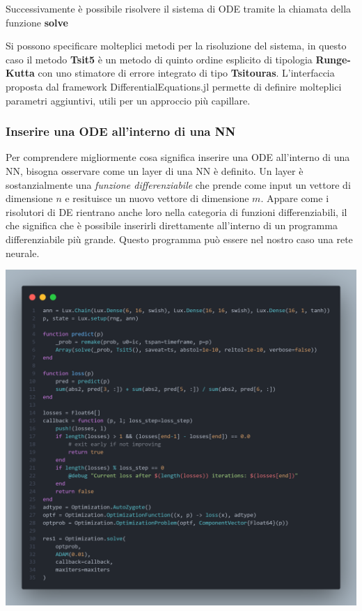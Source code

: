 Successivamente è possibile risolvere il sistema di ODE tramite la chiamata
della funzione \textbf{solve}

Si possono specificare molteplici metodi per la risoluzione del sistema, in 
questo caso il metodo \textbf{Tsit5} \cite{10.1016/j.camwa.2011.06.002} è un metodo 
di quinto ordine esplicito di tipologia \textbf{Runge-Kutta} con uno stimatore di errore
integrato di tipo \textbf{Tsitouras}. L'interfaccia proposta dal framework DifferentialEquations.jl 
permette di definire molteplici parametri aggiuntivi, utili per un approccio più capillare.

\subsubsection*{Inserire una ODE all'interno di una NN}
Per comprendere migliormente cosa significa inserire una ODE all'interno di una 
NN, bisogna osservare come un layer di una NN è definito. Un layer è sostanzialmente
una \emph{funzione differenziabile} che prende come input un vettore di dimensione $n$ 
e resituisce un nuovo vettore di dimensione $m$. Appare come i risolutori di DE rientrano 
anche loro nella categoria di funzioni differenziabili, il che significa che è possibile
inserirli direttamente all'interno di un programma differenziabile più grande.
Questo programma può essere nel nostro caso una rete neurale. 

\begin{minipage}{\linewidth}
    \centering
    \includegraphics[width=\textwidth]{img/fann.png}
    \label{fig:NN_Julia_example}
\end{minipage}

